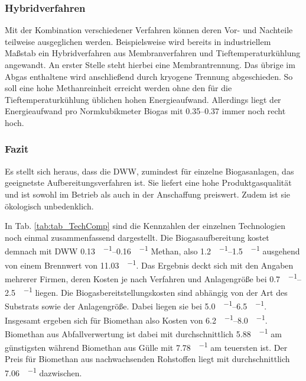 \subsubsection{Hybridverfahren}
Mit der Kombination verschiedener Verfahren können deren Vor- und Nachteile teilweise ausgeglichen werden. Beispielsweise wird bereits in industriellem Maßstab ein Hybridverfahren aus Membranverfahren und Tieftemperaturkühlung angewandt. An erster Stelle steht hierbei eine Membrantrennung. Das übrige im Abgas enthaltene  wird anschließend durch kryogene Trennung abgeschieden. So soll eine hohe Methanreinheit erreicht werden ohne den für die Tieftemperaturkühlung üblichen hohen Energieaufwand. Allerdings liegt der Energieaufwand pro Normkubikmeter Biogas mit \SIrange{0,35}{0,37}{\sieuro} immer noch recht hoch. \parencite{dena2019}\smallskip


\subsubsection{Fazit}
Es stellt sich heraus, dass die \gls{DWW}, zumindest für einzelne Biogasanlagen, das geeignetste Aufbereitungsverfahren ist. Sie liefert eine hohe Produktgasqualität und ist sowohl im Betrieb als auch in der Anschaffung preiswert. Zudem ist sie ökologisch unbedenklich.\smallskip

In Tab. \ref{tab:tab_TechComp} sind die Kennzahlen der einzelnen Technologien noch einmal zusammenfassend dargestellt. Die Biogasaufbereitung kostet demnach mit \gls{DWW} \SIrange{0,13}{0,16}{\sieuro\per\normvol} Methan, also \SIrange{1,2}{1,5}{\ct\per\kwh} ausgehend von einem Brennwert von \SI{11,03}{\kwh\per\normvol}. Das Ergebnis deckt sich mit den Angaben mehrerer Firmen, deren Kosten je nach Verfahren und Anlagengröße bei \SIrange{0,7}{2,5}{\ct\per\kwh} liegen. Die Biogasbereitstellungskosten sind abhängig von der Art des Substrats sowie der Anlagengröße. Dabei liegen sie bei \SIrange{5,0}{6,5}{\ct\per\kwh}. Insgesamt ergeben sich für Biomethan also Kosten von \SIrange{6,2}{8,0}{\ct\per\kwh}. Biomethan aus Abfallverwertung ist dabei mit durchschnittlich \SI{5,88}{\ct\per\kwh} am günstigsten während Biomethan aus Gülle mit \SI{7,78}{\ct\per\kwh} am teuersten ist. Der Preis für Biomethan aus nachwachsenden Rohstoffen liegt mit durchschnittlich \SI{7,06}{\ct\per\kwh} dazwischen. \parencite{FNR14} \parencite{meier14} \parencite{dena19}




